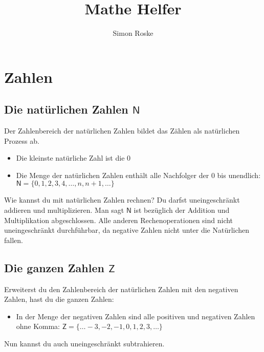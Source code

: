 \documentclass[letterpaper, titlepage]{article}
\author{Simon Roske}
\title{Mathe Helfer}
\begin{document}
\maketitle
\tableofcontents
\begingroup
  \pagestyle{empty}
  \cleardoublepage
\endgroup


\section{Zahlen}\label{Zahlen}
\subsection{Die natürlichen Zahlen $\mathsf{N}$}\label{Die natürlichen Zahlen}
Der Zahlenbereich der natürlichen Zahlen bildet das Zählen als natürlichen Prozess ab.
\begin{itemize}
    \item Die kleinste natürliche Zahl ist die 0
    \item Die Menge der natürlichen Zahlen enthält alle Nachfolger der 0 bis unendlich: $\mathsf{N}=\{0,1,2,3,4,…,n,n+1,…\}$
\end{itemize}
Wie kannst du mit natürlichen Zahlen rechnen? Du darfst uneingeschränkt addieren und multiplizieren. Man sagt $\mathsf{N}$ ist bezüglich der Addition und Multiplikation abgeschlossen. Alle anderen Rechenoperationen sind nicht uneingeschränkt durchführbar, da negative Zahlen nicht unter die Natürlichen fallen.
\subsection{Die ganzen Zahlen $\mathsf{Z}$}\label{Die ganzen Zahlen}
Erweiterst du den Zahlenbereich der natürlichen Zahlen mit den negativen Zahlen, hast du die ganzen Zahlen:
\begin{itemize}
    \item In der Menge der negativen Zahlen sind alle positiven und negativen Zahlen ohne Komma: $\mathsf{Z}=\{…-3,-2,-1,0,1,2,3,…\}$
\end{itemize}
Nun kannst du auch uneingeschränkt subtrahieren.
\end{document}
